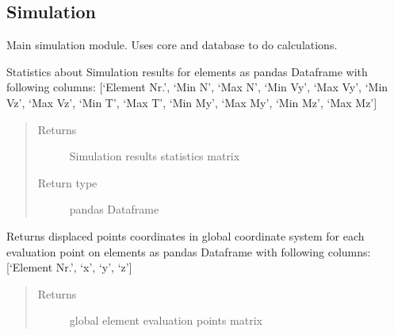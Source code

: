 \documentclass[letterpaper,10pt,english]{sphinxmanual}
\begin{document}
\subsection{Simulation}
\label{\detokenize{api:module-beamon.simulation}}\label{\detokenize{api:simulation}}

\begin{fulllineitems}
\label{\detokenize{api:beamon.simulation.Simulation}}
Main simulation module. Uses core and database to do calculations.

\begin{fulllineitems}
\label{\detokenize{api:beamon.simulation.Simulation.element_stats}}
Statistics about Simulation results for elements as pandas Dataframe with following columns:
{[}‘Element Nr.’, ‘Min N’, ‘Max N’, ‘Min Vy’, ‘Max Vy’, ‘Min Vz’, ‘Max Vz’, ‘Min T’, ‘Max T’, ‘Min My’, ‘Max My’,
‘Min Mz’, ‘Max Mz’{]}
\begin{quote}\begin{description}
\item[{Returns}] \leavevmode
Simulation results statistics matrix

\item[{Return type}] \leavevmode
pandas Dataframe

\end{description}\end{quote}

\end{fulllineitems}


\begin{fulllineitems}
\label{\detokenize{api:beamon.simulation.Simulation.global_element_displaced_points}}
Returns displaced points coordinates in global coordinate system for each evaluation point on elements
as pandas Dataframe with following columns:
{[}‘Element Nr.’, ‘x’, ‘y’, ‘z’{]}
\begin{quote}\begin{description}
\item[{Returns}] \leavevmode
global element evaluation points matrix


\end{description}
\end{quote}
\end{fulllineitems}
\end{fulllineitems}
\end{document}
